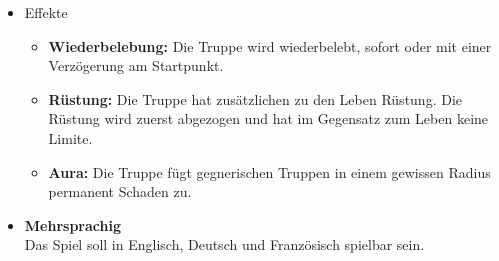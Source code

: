 \begin{itemize}
    \item Effekte
    \begin{itemize}
        \item \textbf{Wiederbelebung:}
            Die Truppe wird wiederbelebt, sofort oder mit einer Verzögerung am Startpunkt.
        \item \textbf{Rüstung:}
            Die Truppe hat zusätzlichen zu den Leben Rüstung. Die Rüstung wird zuerst abgezogen und hat im Gegensatz zum Leben keine Limite.
        \item \textbf{Aura:}
            Die Truppe fügt gegnerischen Truppen in einem gewissen Radius permanent Schaden zu.
    \end{itemize}
    \item \textbf{Mehrsprachig} \\
        Das Spiel soll in Englisch, Deutsch und Französisch spielbar sein.
\end{itemize}

